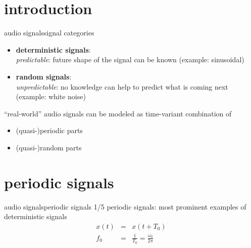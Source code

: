     \section[intro]{introduction}
        \begin{frame}{audio signals}{signal categories}
            \begin{itemize}
                \item	\textbf{deterministic signals}:\\
                        \textit{predictable}: future shape of the signal can be known (example: sinusoidal)
                \pause		
                \item	\textbf{random signals}:\\
                        \textit{unpredictable}: no knowledge can help to predict what is coming next (example: white noise)
            \end{itemize}
            
            \bigskip
            \pause
            ``real-world'' audio signals can be modeled as time-variant combination of 
            \begin{itemize}
                \item	(quasi-)periodic parts
                \item	(quasi-)random parts
            \end{itemize}
        \end{frame}

    \section[periodic signals]{periodic signals}
        \begin{frame}{audio signals}{periodic signals 1/5}
            \vspace{-2mm}
            periodic signals: most prominent examples of deterministic signals
            \begin{eqnarray*}
                x(t) 	&=& x(t+T_0)\\
                f_0 	&=& \frac{1}{T_0} =  \frac{\omega_0}{2\pi}
            \end{eqnarray*}

            \vspace{-4mm}
        \end{frame}

